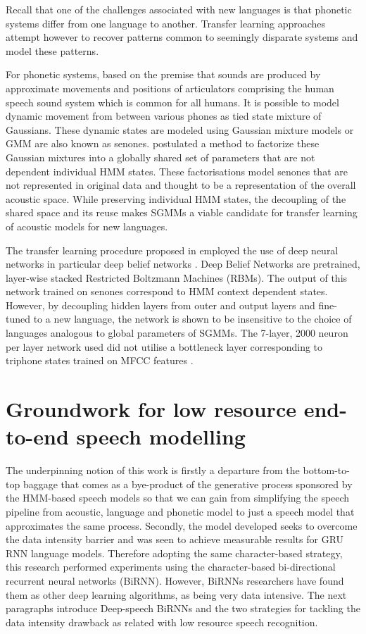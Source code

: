 Recall that one of the challenges associated with new languages is that phonetic systems differ from one language to another.  Transfer learning approaches attempt however to recover patterns common to seemingly disparate systems and model these patterns.  

For phonetic systems, based on the premise that sounds are produced by approximate movements and positions of articulators comprising the human speech sound system which is common for all humans.  It is possible to model dynamic movement from between various phones as tied state mixture of Gaussians. These dynamic states are modeled using Gaussian mixture models or GMM are also known as senones. \cite{povey2011subspace} postulated a method to factorize these Gaussian mixtures into a globally shared set of parameters that are not dependent individual HMM states.  These factorisations model senones that are not represented in original data and thought to be a representation of the overall acoustic space.  While preserving individual HMM states, the decoupling of the shared space and its reuse makes SGMMs a viable candidate for transfer learning of acoustic models for new languages.

The transfer learning procedure proposed in \cite{ghoshal2013multilingual} employed the use of deep neural networks in particular deep belief networks \citep{bengio2007greedy}.  Deep Belief Networks are pretrained, layer-wise  stacked Restricted Boltzmann Machines (RBMs)\citep{smolensky1986information}.  The output of this network trained on senones correspond to HMM context dependent states.  However, by decoupling hidden layers from outer and output layers and fine-tuned to a new language, the network is shown to be insensitive to the choice of languages analogous to global parameters of SGMMs. The 7-layer, 2000 neuron per layer network used did not utilise a bottleneck layer corresponding to triphone states trained on MFCC features \citep{grezl2008optimizing}.

\section{Groundwork for low resource end-to-end speech modelling}
The underpinning notion of this work is firstly a departure from the bottom-to-top baggage that comes as a bye-product of the generative process sponsored by the HMM-based speech models so that we can gain from simplifying the speech pipeline from acoustic, language and phonetic model to just a speech model that approximates the same process.  Secondly, the model developed seeks to overcome the data intensity barrier and was seen to achieve measurable results for GRU RNN language models.  Therefore adopting the same character-based strategy, this research performed experiments using the character-based bi-directional recurrent neural networks (BiRNN).  However, BiRNNs researchers have found them as other deep learning algorithms, as being very data intensive\cite{hannun2014deep}.  The next paragraphs introduce Deep-speech BiRNNs and the two strategies for tackling the data intensity drawback as related with low resource speech recognition.

